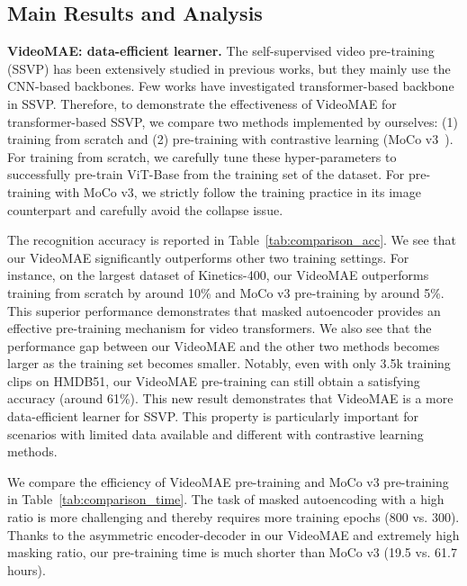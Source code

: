 \documentclass{article}
\begin{document}
\subsection{Main Results and Analysis}
{\flushleft \bf VideoMAE: data-efficient learner.} The self-supervised video pre-training (SSVP) has been extensively studied in previous works, but they mainly use the CNN-based backbones. Few works have investigated transformer-based backbone in SSVP. Therefore, to demonstrate the effectiveness of VideoMAE for transformer-based SSVP, we compare two methods implemented by ourselves: (1) training from scratch and (2) pre-training with contrastive learning (MoCo v3~\cite{mocov3}). For training from scratch, we carefully tune these hyper-parameters to successfully pre-train ViT-Base from the training set of the dataset. For pre-training with MoCo v3, we strictly follow the training practice in its image counterpart and carefully avoid the collapse issue.

The recognition accuracy is reported in Table~\ref{tab:comparison_acc}. We see that our VideoMAE significantly outperforms other two training settings. For instance, on the largest dataset of Kinetics-400, our VideoMAE outperforms training from scratch by around 10\% and MoCo v3 pre-training by around 5\%. This superior performance demonstrates that masked autoencoder provides an effective pre-training mechanism for video transformers. We also see that the performance gap between our VideoMAE and the other two methods becomes larger as the training set becomes smaller. Notably, even with only 3.5k training clips on HMDB51, our VideoMAE pre-training can still obtain a satisfying accuracy (around 61\%). This new result demonstrates that VideoMAE is a more data-efficient learner for SSVP. This property is particularly important for scenarios with limited data available and different with contrastive learning methods.

We compare the efficiency of VideoMAE pre-training and MoCo v3 pre-training in Table~\ref{tab:comparison_time}. The task of masked autoencoding with a high ratio is more challenging and thereby requires more training epochs (800 vs. 300). Thanks to the asymmetric encoder-decoder in our VideoMAE and extremely high masking ratio, our pre-training time is much shorter than MoCo v3 (19.5 vs. 61.7 hours).
\end{document}
